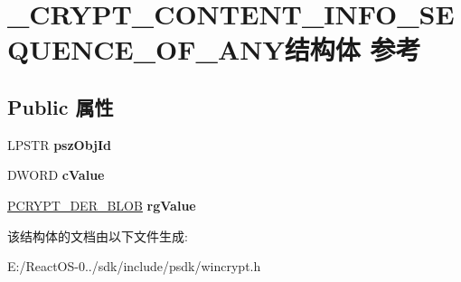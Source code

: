 \hypertarget{struct___c_r_y_p_t___c_o_n_t_e_n_t___i_n_f_o___s_e_q_u_e_n_c_e___o_f___a_n_y}{}\section{\+\_\+\+C\+R\+Y\+P\+T\+\_\+\+C\+O\+N\+T\+E\+N\+T\+\_\+\+I\+N\+F\+O\+\_\+\+S\+E\+Q\+U\+E\+N\+C\+E\+\_\+\+O\+F\+\_\+\+A\+N\+Y结构体 参考}
\label{struct___c_r_y_p_t___c_o_n_t_e_n_t___i_n_f_o___s_e_q_u_e_n_c_e___o_f___a_n_y}
\subsection*{Public 属性}
\begin{DoxyCompactItemize}
\item 
\mbox{\label{struct___c_r_y_p_t___c_o_n_t_e_n_t___i_n_f_o___s_e_q_u_e_n_c_e___o_f___a_n_y_ab9bd69b5637224caac149b1b69ec535c}} 
L\+P\+S\+TR {\bfseries psz\+Obj\+Id}
\item 
\mbox{\label{struct___c_r_y_p_t___c_o_n_t_e_n_t___i_n_f_o___s_e_q_u_e_n_c_e___o_f___a_n_y_af15116473616a48547d50ead58def790}} 
D\+W\+O\+RD {\bfseries c\+Value}
\item 
\mbox{\label{struct___c_r_y_p_t___c_o_n_t_e_n_t___i_n_f_o___s_e_q_u_e_n_c_e___o_f___a_n_y_a451370bdda79312664dc583b5aa1d311}} 
\hyperlink{struct___c_r_y_p_t_o_a_p_i___b_l_o_b}{P\+C\+R\+Y\+P\+T\+\_\+\+D\+E\+R\+\_\+\+B\+L\+OB} {\bfseries rg\+Value}
\end{DoxyCompactItemize}


该结构体的文档由以下文件生成\+:\begin{DoxyCompactItemize}
\item 
E\+:/\+React\+O\+S-\/0../sdk/include/psdk/wincrypt.\+h\end{DoxyCompactItemize}
